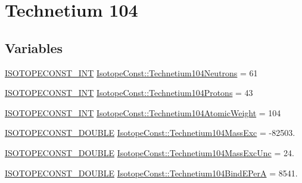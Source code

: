 \hypertarget{group___isotope_const-_technetium-_tc104}{}\section{Technetium 104}
\label{group___isotope_const-_technetium-_tc104}
\subsection*{Variables}
\begin{DoxyCompactItemize}
\item 
\mbox{\hyperlink{group___isotope_const-_macros_ga5f18360b3e99483a35c32d789e62621c}{I\+S\+O\+T\+O\+P\+E\+C\+O\+N\+S\+T\+\_\+\+I\+NT}} \mbox{\hyperlink{group___isotope_const-_technetium-_tc104_ga8538cd35b27c6e8b05fd9109c60d4516}{Isotope\+Const\+::\+Technetium104\+Neutrons}} = 61
\item 
\mbox{\hyperlink{group___isotope_const-_macros_ga5f18360b3e99483a35c32d789e62621c}{I\+S\+O\+T\+O\+P\+E\+C\+O\+N\+S\+T\+\_\+\+I\+NT}} \mbox{\hyperlink{group___isotope_const-_technetium-_tc104_ga78c7ccdca2e0137dce9ca34883ce6acb}{Isotope\+Const\+::\+Technetium104\+Protons}} = 43
\item 
\mbox{\hyperlink{group___isotope_const-_macros_ga5f18360b3e99483a35c32d789e62621c}{I\+S\+O\+T\+O\+P\+E\+C\+O\+N\+S\+T\+\_\+\+I\+NT}} \mbox{\hyperlink{group___isotope_const-_technetium-_tc104_ga1f4603d8ce188f98956cef351853d652}{Isotope\+Const\+::\+Technetium104\+Atomic\+Weight}} = 104
\item 
\mbox{\hyperlink{group___isotope_const-_macros_ga8f45a7272ce02c0b4c65c44636ed719a}{I\+S\+O\+T\+O\+P\+E\+C\+O\+N\+S\+T\+\_\+\+D\+O\+U\+B\+LE}} \mbox{\hyperlink{group___isotope_const-_technetium-_tc104_ga6c5a60f6d5134017297d3fce356ab1af}{Isotope\+Const\+::\+Technetium104\+Mass\+Exc}} = -\/82503.
\item 
\mbox{\hyperlink{group___isotope_const-_macros_ga8f45a7272ce02c0b4c65c44636ed719a}{I\+S\+O\+T\+O\+P\+E\+C\+O\+N\+S\+T\+\_\+\+D\+O\+U\+B\+LE}} \mbox{\hyperlink{group___isotope_const-_technetium-_tc104_gae4fc82b143c40669958aa47e8b67c585}{Isotope\+Const\+::\+Technetium104\+Mass\+Exc\+Unc}} = 24.
\item 
\mbox{\hyperlink{group___isotope_const-_macros_ga8f45a7272ce02c0b4c65c44636ed719a}{I\+S\+O\+T\+O\+P\+E\+C\+O\+N\+S\+T\+\_\+\+D\+O\+U\+B\+LE}} \mbox{\hyperlink{group___isotope_const-_technetium-_tc104_gade7f96ce71d7bd68fbce4eca25ac7a29}{Isotope\+Const\+::\+Technetium104\+Bind\+E\+PerA}} = 8541.

\end{DoxyCompactItemize}
